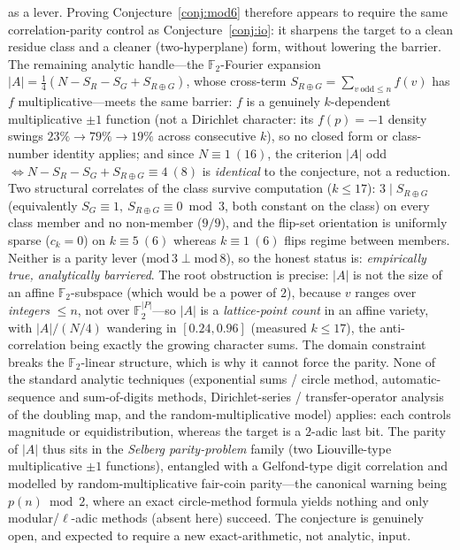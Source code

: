 \documentclass[11pt]{article}
\theoremstyle{remark}\newtheorem{remark}[theorem]{Remark}
\begin{document}
as a lever. Proving Conjecture~\ref{conj:mod6} therefore appears to require the same
correlation-parity control as Conjecture~\ref{conj:io}: it sharpens the target to a clean residue
class and a cleaner (two-hyperplane) form, without lowering the barrier. The
remaining analytic handle---the $\mathbb F_2$-Fourier expansion $|A|=\tfrac14(N-S_R-S_G+S_{R\oplus
G})$, whose cross-term $S_{R\oplus G}=\sum_{v\ \mathrm{odd}\le n}f(v)$ has $f$ multiplicative---meets
the same barrier: $f$ is a genuinely $k$-dependent multiplicative $\pm1$ function (not a
Dirichlet character: its $f(p)=-1$ density swings $23\%\!\to\!79\%\!\to\!19\%$ across consecutive
$k$), so no closed form or class-number identity applies; and since $N\equiv1\ (16)$, the criterion
$|A|$ odd $\iff N-S_R-S_G+S_{R\oplus G}\equiv4\ (8)$ is \emph{identical} to the conjecture, not a
reduction. Two structural correlates of the class survive computation ($k\le17$): $3\mid S_{R\oplus G}$ (equivalently $S_G\equiv1,\ S_{R\oplus G}\equiv0\bmod3$, both constant on the class) on every class member and no non-member ($9/9$), and the flip-set orientation is uniformly sparse
($c_k=0$) on $k\equiv5\ (6)$ whereas $k\equiv1\ (6)$ flips regime between members. Neither is a
parity lever ($\mathrm{mod}\,3\perp\mathrm{mod}\,8$), so the honest status is: \emph{empirically
true, analytically barriered}. The root obstruction is precise: $|A|$ is not the size of an affine
$\mathbb F_2$-subspace (which would be a power of $2$), because $v$ ranges over \emph{integers} $\le
n$, not over $\mathbb F_2^{|P|}$---so $|A|$ is a \emph{lattice-point count} in an affine variety, with
$|A|/(N/4)$ wandering in $[0.24,0.96]$ (measured $k\le17$), the anti-correlation being exactly the
growing character sums. The domain constraint breaks the $\mathbb F_2$-linear structure, which is why it cannot force the parity. None of the standard analytic techniques (exponential sums / circle method, automatic-sequence and sum-of-digits methods, Dirichlet-series / transfer-operator analysis of the doubling map, and the random-multiplicative model) applies: each controls magnitude or equidistribution, whereas the target is a $2$-adic last bit. The parity of $|A|$ thus sits in the \emph{Selberg parity-problem} family (two Liouville-type multiplicative $\pm1$ functions), entangled with a Gelfond-type digit correlation and modelled by random-multiplicative fair-coin parity---the canonical warning being $p(n)\bmod2$, where an exact circle-method formula yields nothing and only modular/$\ell$-adic methods (absent here) succeed. The conjecture is genuinely open, and expected to require a new exact-arithmetic, not analytic, input.
\end{document}
